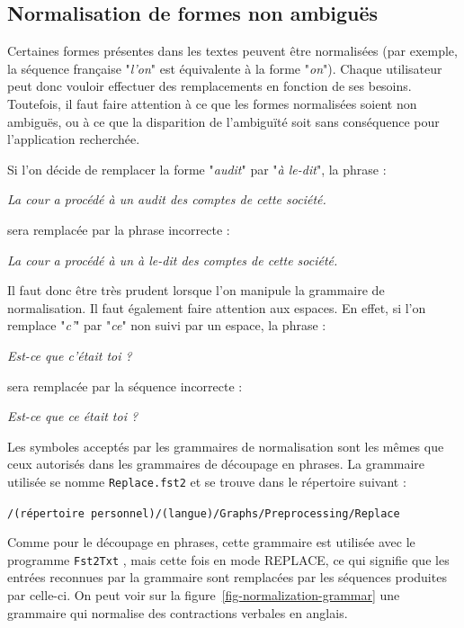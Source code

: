 \subsection{Normalisation de formes non ambiguës}

Certaines formes présentes dans les textes peuvent être normalisées (par exemple, la séquence
française "\textit{l'on}" est équivalente à la forme "\textit{on}"). Chaque utilisateur peut donc
vouloir effectuer des remplacements en fonction de ses besoins. Toutefois, il faut faire
attention à ce que les formes normalisées soient non ambiguës, ou à ce que la disparition de
l’ambiguïté soit sans conséquence pour l’application recherchée.


\bigskip
\noindent Si l’on décide de remplacer la forme "\textit{audit}" par "\textit{à le-dit}",
 la phrase :

\bigskip
\textit{La cour a procédé à un audit des comptes de cette société.}

\bigskip
\noindent sera remplacée par la phrase incorrecte :

\bigskip
\textit{La cour a procédé à un à le-dit des comptes de cette société.}

\bigskip
\noindent Il faut donc être très prudent lorsque l’on manipule la grammaire de normalisation.
Il faut également faire attention aux espaces.
En effet, si l’on remplace "\textit{c’}" par "\textit{ce}" non suivi par un espace, la phrase :


\bigskip
\textit{Est-ce que c’était toi ?}

\bigskip
\noindent sera remplacée par la séquence incorrecte :

\bigskip
\textit{Est-ce que ce était toi ?}


\bigskip
\noindent Les symboles acceptés par les grammaires de normalisation sont les mêmes que ceux
autorisés dans les grammaires de découpage en phrases. La grammaire utilisée se nomme
\verb+Replace.fst2+ et se trouve dans le répertoire suivant :

\bigskip \verb+/(répertoire personnel)/(langue)/Graphs/Preprocessing/Replace+

\bigskip
\noindent Comme pour le découpage en phrases, cette grammaire est utilisée avec le programme
\verb+Fst2Txt+ , mais cette fois en
mode REPLACE, ce qui signifie que les entrées reconnues par la grammaire sont remplacées par les
séquences produites par celle-ci. On peut voir sur la figure~\ref{fig-normalization-grammar} une
grammaire qui normalise des contractions verbales en anglais.

